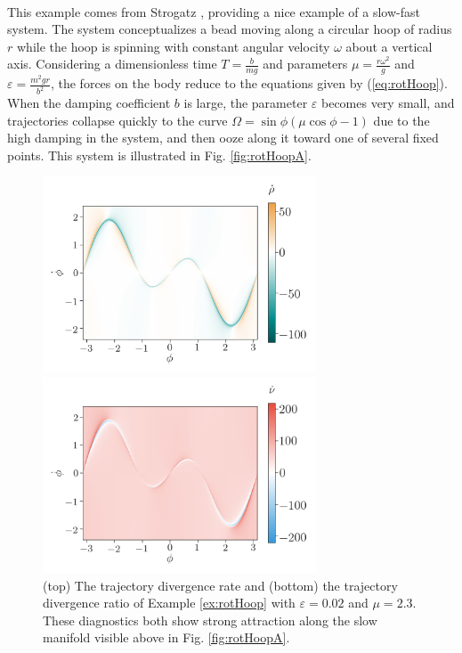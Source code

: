 \documentclass[twocolumn]{svjour3}
\begin{document}
 \\
This example comes from Strogatz \cite[Section 3.5]{strogatz_nonlinear_2014}, providing a nice example of a slow-fast system. The system conceptualizes a bead moving along a circular hoop of radius $r$ while the hoop is spinning with constant angular velocity $\omega$ about a vertical axis. Considering a dimensionless time $T=\tfrac{b}{mg}$ and parameters $\mu=\tfrac{r\omega^2}{g}$ and $\varepsilon=\tfrac{m^2gr}{b^2}$, the forces on the body reduce to the equations given by (\ref{eq:rotHoop}). When the damping coefficient $b$ is large, the parameter $\varepsilon$ becomes very small, and trajectories collapse quickly to the curve $\Omega = \sin\phi (\mu \cos\phi - 1)$ due to the high damping in the system, and then ooze along it toward one of several fixed points. This system is illustrated in Fig. \ref{fig:rotHoopA}.

\begin{figure}
\begin{minipage}{3.2in}
\centering
\includegraphics[width=3.2in]{RepRate_rotating-hoop.png}
\end{minipage}
\begin{minipage}{3.2in}
\centering
\includegraphics[width=3.2in]{RepRatio_rotating-hoop.png}
\end{minipage}
\caption{\label{fig:rotHoopB} (top) The trajectory divergence rate and (bottom) the trajectory divergence ratio of Example \ref{ex:rotHoop} with $\varepsilon = 0.02$ and $\mu = 2.3$. These diagnostics both show strong attraction along the slow manifold visible above in Fig. \ref{fig:rotHoopA}.}
\end{figure}
\end{document}

